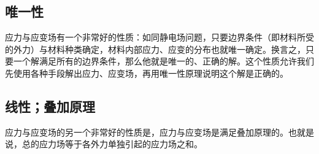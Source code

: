 
\begin{issues}
\issueDraft
\end{issues}

\subsection{唯一性}
应力与应变场有一个非常好的性质：如同静电场问题，只要边界条件（即材料所受的外力）与材料种类确定，材料内部应力、应变的分布也就唯一确定。换言之，只要一个解满足所有的边界条件，那么他就是唯一的、正确的解。这个性质允许我们先使用各种手段解出应力、应变场，再用唯一性原理说明这个解是正确的。

\subsection{线性；叠加原理}
应力与应变场的另一个非常好的性质是，应力与应变场是满足叠加原理的。也就是说，总的应力场等于各外力单独引起的应力场之和。%

